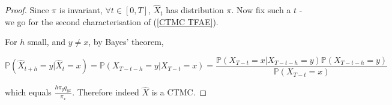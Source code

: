 \documentclass[11pt]{scrartcl}
\begin{document}
\begin{proof}
Since $\pi$ is invariant, $\forall t \in [0, T]$, $\hat{X}_t$ has distribution $\pi$. Now fix such a $t$ - we go for the second characterisation of (\ref{CTMC TFAE}). 

For $h$ small, and $y \neq x$, by Bayes' theorem,

\begin{equation}
    \mathbb{ P}( \hat{X}_{t+h} = y | \hat{X}_t = x) = \mathbb{ P}( X_{T-t-h} = y | X_{T-t} = x ) = \frac{\mathbb{ P}(X_{T-t}=x | X_{T-t-h}=y) \mathbb{ P}(X_{T-t-h}=y)}{\mathbb{ P}(X_{T-t}=x)}
\end{equation}

which equals $\frac{h \pi_y q_{yx}}{\pi_x}$. Therefore indeed $\hat{X}$ is a CTMC.

\end{proof}
\end{document}
